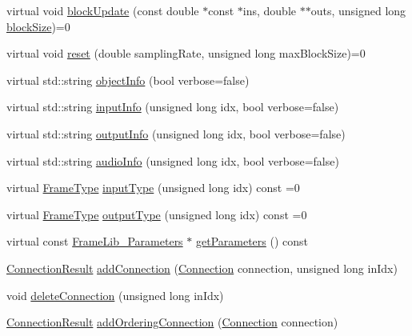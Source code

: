 \begin{DoxyCompactItemize}
\item 
virtual void \hyperlink{class_frame_lib___object_abd8e6ba645082041000b7a0b67c9b011}{block\+Update} (const double $\ast$const $\ast$ins, double $\ast$$\ast$outs, unsigned long \hyperlink{_frame_lib___memory_8cpp_a8ef7d53a4cac28bf580a61f265fcaaa6}{block\+Size})=0
\item 
virtual void \hyperlink{class_frame_lib___object_aeb02311ab422dd569aeb982e31a66893}{reset} (double sampling\+Rate, unsigned long max\+Block\+Size)=0
\item 
virtual std\+::string \hyperlink{class_frame_lib___object_a10d673de9a3c59ace6a22ba1cff313c8}{object\+Info} (bool verbose=false)
\item 
virtual std\+::string \hyperlink{class_frame_lib___object_a49abea5f18125c425b1eae8710735891}{input\+Info} (unsigned long idx, bool verbose=false)
\item 
virtual std\+::string \hyperlink{class_frame_lib___object_a6e6d79e8d620eedbaa50abf324cdedf5}{output\+Info} (unsigned long idx, bool verbose=false)
\item 
virtual std\+::string \hyperlink{class_frame_lib___object_af618fcdec82b457911147c7c293bedd7}{audio\+Info} (unsigned long idx, bool verbose=false)
\item 
virtual \hyperlink{_frame_lib___types_8h_ad495a9f61af7fff07d7e97979d1ab854}{Frame\+Type} \hyperlink{class_frame_lib___object_ab1ab1ae8180bb8b7e881aac6a4e1066c}{input\+Type} (unsigned long idx) const =0
\item 
virtual \hyperlink{_frame_lib___types_8h_ad495a9f61af7fff07d7e97979d1ab854}{Frame\+Type} \hyperlink{class_frame_lib___object_a03eb408844f15d8f73cee67f43149b9d}{output\+Type} (unsigned long idx) const =0
\item 
virtual const \hyperlink{class_frame_lib___parameters}{Frame\+Lib\+\_\+\+Parameters} $\ast$ \hyperlink{class_frame_lib___object_ac90a6770aeef26ee1601889dc16dba56}{get\+Parameters} () const
\item 
\hyperlink{_frame_lib___types_8h_a2a427ca8c6f961bac8e41f6edecf0722}{Connection\+Result} \hyperlink{class_frame_lib___object_a53722775485e80ba9590750ad68e437b}{add\+Connection} (\hyperlink{struct_frame_lib___object_1_1_connection}{Connection} connection, unsigned long in\+Idx)
\item 
void \hyperlink{class_frame_lib___object_aa7dbc1735ebd68008abd939d50edce49}{delete\+Connection} (unsigned long in\+Idx)
\item 
\hyperlink{_frame_lib___types_8h_a2a427ca8c6f961bac8e41f6edecf0722}{Connection\+Result} \hyperlink{class_frame_lib___object_aaa1ec62334620a049632f72ad2c22538}{add\+Ordering\+Connection} (\hyperlink{struct_frame_lib___object_1_1_connection}{Connection} connection)
$$
\end{DoxyCompactItemize}
